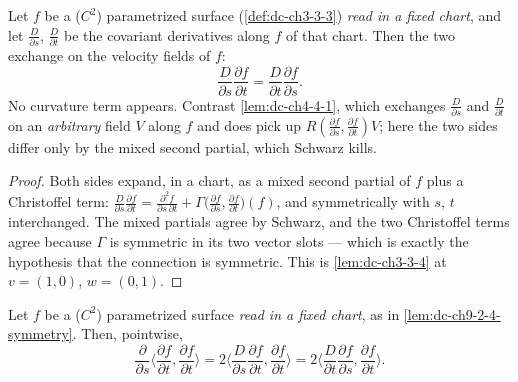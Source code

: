 \begin{lemma}
  \label{lem:dc-ch9-2-4-symmetry}


  Let $f$ be a ($C^2$) parametrized surface (\cref{def:dc-ch3-3-3}) \emph{read in a fixed
  chart}, and let $\frac{D}{\partial s}$, $\frac{D}{\partial t}$ be the covariant
  derivatives along $f$ of that chart. Then the two exchange on the velocity fields of $f$:
  $$
  \frac{D}{\partial s}\frac{\partial f}{\partial t}
    = \frac{D}{\partial t}\frac{\partial f}{\partial s}.
  $$
  No curvature term appears. Contrast \cref{lem:dc-ch4-4-1}, which exchanges
  $\frac{D}{\partial s}$ and $\frac{D}{\partial t}$ on an \emph{arbitrary} field $V$ along
  $f$ and does pick up $R(\frac{\partial f}{\partial s},\frac{\partial f}{\partial t})V$;
  here the two sides differ only by the mixed second partial, which Schwarz kills.

\end{lemma}
\begin{proof}

  \sketch
  Both sides expand, in a chart, as a mixed second partial of $f$ plus a Christoffel term:
  $\frac{D}{\partial s}\frac{\partial f}{\partial t}
   = \frac{\partial^2 f}{\partial s\,\partial t}
     + \Gamma\big(\frac{\partial f}{\partial s},\frac{\partial f}{\partial t}\big)(f)$, and
  symmetrically with $s$, $t$ interchanged. The mixed partials agree by Schwarz, and the two
  Christoffel terms agree because $\Gamma$ is symmetric in its two vector slots --- which is
  exactly the hypothesis that the connection is symmetric. This is \cref{lem:dc-ch3-3-4} at
  $v=(1,0)$, $w=(0,1)$.
\end{proof}
\begin{lemma}
  \label{lem:dc-ch9-2-4-energy-density}


  Let $f$ be a ($C^2$) parametrized surface \emph{read in a fixed chart}, as in
  \cref{lem:dc-ch9-2-4-symmetry}. Then, pointwise,
  $$
  \frac{\partial}{\partial s}\Big\langle\frac{\partial f}{\partial t},\frac{\partial f}{\partial t}\Big\rangle
    = 2\Big\langle\frac{D}{\partial s}\frac{\partial f}{\partial t},\frac{\partial f}{\partial t}\Big\rangle
    = 2\Big\langle\frac{D}{\partial t}\frac{\partial f}{\partial s},\frac{\partial f}{\partial t}\Big\rangle.
  $$
\end{lemma}
